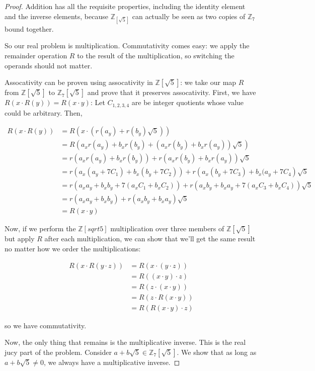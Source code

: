 \documentclass[12pt]{article} %
\newcommand{\Z}{\mathbb{Z}}
\begin{document}
\begin{flushleft}
\begin{enumerate}[(a)]
\begin{proof}
  Addition has all the requisite properties, including the identity element and the inverse elements, because $\Z_[\sqrt5]$ can actually be seen as two copies of $\Z_7$ bound together.

  So our real problem is multiplication. Commutativity comes easy: we apply the remainder operation $R$ to the result of the multiplication, so switching the operands should not matter.
  
  Assocativity can be proven using assocativity in $\Z[\sqrt5]$: we take our map $R$ from $\Z[\sqrt5]$ to $\Z_7[\sqrt5]$ and prove that it preserves assocativity. First, we have $R(x\cdot R(y)) = R(x\cdot y)$: Let $C_{1,2,3,4}$ are be integer quotients whose value could be arbitrary. Then,

  \begin{align*}
    R(x\cdot R(y)) &= R(x \cdot (r(a_y) + r(b_y)\sqrt 5))\\
    &= R(a_x r(a_y) + b_xr(b_y) + (a_x r(b_y) + b_x r(a_y))\sqrt5)\\
    &= r(a_x r(a_y) + b_xr(b_y)) + r\left(
      a_x r(b_y) + b_x r(a_y)
      \right)\sqrt5\\
    &= r(a_x (a_y + 7C_1) + b_x (b_y + 7C_2)) + r\left(a_x (b_y + 7C_3) + b_x (a_y + 7C_4\right)\sqrt5\\
    &= r(a_x a_y + b_x b_y + 7(a_xC_1 + b_xC_2)) + r\left(a_xb_y + b_x a_y + 7(a_x C_3 + b_x C_4)\right)\sqrt5\\
    &= r(a_x a_y + b_x b_y) + r(a_x b_y + b_x a_y) \sqrt5\\
    &= R(x\cdot y)
  \end{align*}

  Now, if we perform the $\Z[sqrt5]$ multiplication over three members of $\Z[\sqrt5]$ but apply $R$ after each multiplication, we can show that we'll get the same result no matter how we order the multiplications:

  \begin{align*}
    R(x\cdot R(y\cdot z)) &= R(x\cdot(y\cdot z))\\
    &= R((x\cdot y)\cdot z) \\
    &= R(z\cdot (x\cdot y))\\
    &= R(z\cdot R(x\cdot y))\\
    &= R(R(x\cdot y)\cdot z)
  \end{align*}

  so we have commutativity.

  Now, the only thing that remains is the multiplicative inverse. This is the real jucy part of the problem. Consider $a+b\sqrt5\in \Z_7[\sqrt5]$. We show that as long as $a+b\sqrt5\neq 0$, we always have a multiplicative inverse.


\end{proof}
\end{enumerate}
\end{flushleft}
\end{document}
